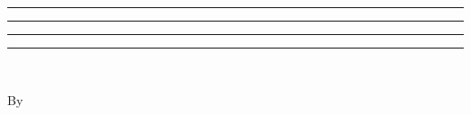 \begin{titlepage}
\centering
\scshape
\vspace*{\baselineskip}

\rule{\textwidth}{1.6pt}\vspace*{-\baselineskip}\vspace*{2pt} 
\rule{\textwidth}{0.4pt}
\vspace{0.75\baselineskip}

{\HUGE\thetitle}

\vspace{0.75\baselineskip}
\rule{\textwidth}{0.4pt}\vspace*{-\baselineskip}\vspace{3.2pt}
\rule{\textwidth}{1.6pt}
\vspace{\baselineskip}

\Large \bookxof\\
\huge{\textbf{\bookseries}}
\vspace{2\baselineskip}

\Large By
\vspace{0.5\baselineskip}

{\scshape\huge\theauthor}
\vfill
\end{titlepage}